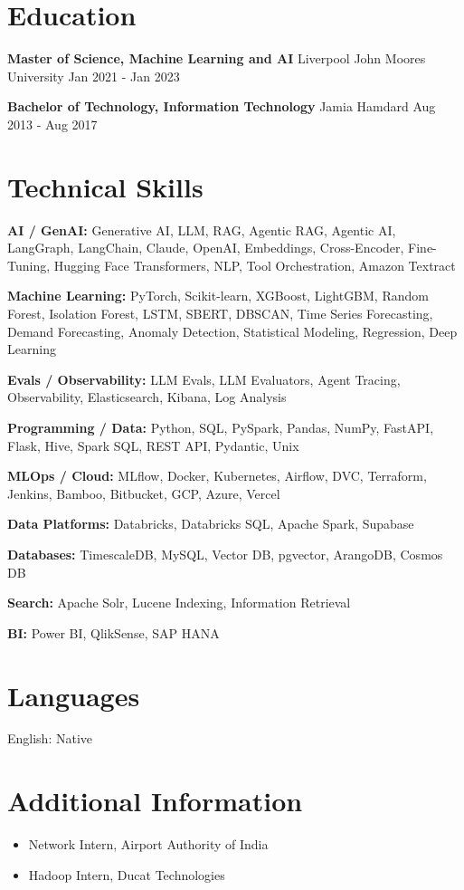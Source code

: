 \documentclass[10pt,a4paper]{article}
\begin{document}
\section{Education}
\textbf{Master of Science, Machine Learning and AI} \textbar{} Liverpool John Moores University \hfill Jan 2021 - Jan 2023\par
\textbf{Bachelor of Technology, Information Technology} \textbar{} Jamia Hamdard \hfill Aug 2013 - Aug 2017\par

\section{Technical Skills}
\textbf{AI / GenAI:} Generative AI, LLM, RAG, Agentic RAG, Agentic AI, LangGraph, LangChain, Claude, OpenAI, Embeddings, Cross-Encoder, Fine-Tuning, Hugging Face Transformers, NLP, Tool Orchestration, Amazon Textract\par
\textbf{Machine Learning:} PyTorch, Scikit-learn, XGBoost, LightGBM, Random Forest, Isolation Forest, LSTM, SBERT, DBSCAN, Time Series Forecasting, Demand Forecasting, Anomaly Detection, Statistical Modeling, Regression, Deep Learning\par
\textbf{Evals / Observability:} LLM Evals, LLM Evaluators, Agent Tracing, Observability, Elasticsearch, Kibana, Log Analysis\par
\textbf{Programming / Data:} Python, SQL, PySpark, Pandas, NumPy, FastAPI, Flask, Hive, Spark SQL, REST API, Pydantic, Unix\par
\textbf{MLOps / Cloud:} MLflow, Docker, Kubernetes, Airflow, DVC, Terraform, Jenkins, Bamboo, Bitbucket, GCP, Azure, Vercel\par
\textbf{Data Platforms:} Databricks, Databricks SQL, Apache Spark, Supabase\par
\textbf{Databases:} TimescaleDB, MySQL, Vector DB, pgvector, ArangoDB, Cosmos DB\par
\textbf{Search:} Apache Solr, Lucene Indexing, Information Retrieval\par
\textbf{BI:} Power BI, QlikSense, SAP HANA\par

\section{Languages}
English: Native\par

\section{Additional Information}
\begin{itemize}
  \item Network Intern, Airport Authority of India
  \item Hadoop Intern, Ducat Technologies
\end{itemize}
\end{document}
